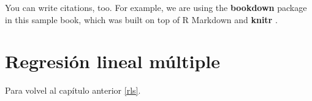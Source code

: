 \documentclass[]{book}
\begin{document}
You can write citations, too. For example, we are using the
\textbf{bookdown} package \citep{R-bookdown} in this sample book, which
was built on top of R Markdown and \textbf{knitr} \citep{xie2015}.

\chapter{Regresión lineal múltiple}\label{rlm}

Para volvel al capítulo anterior \ref{rls}.


\end{document}

